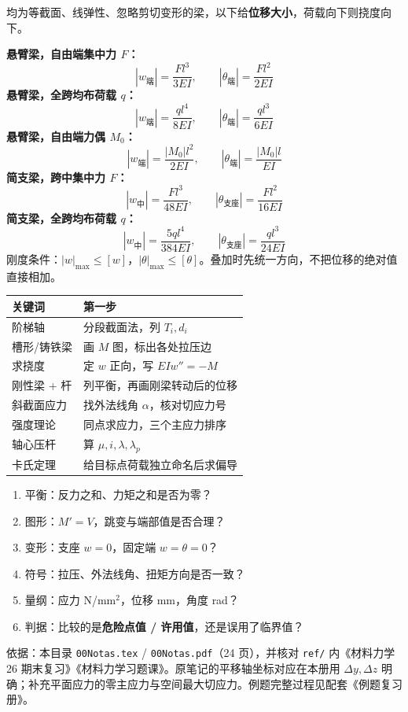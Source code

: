 \documentclass[a4paper,10pt,fontset=none]{ctexart}
\begin{document}
\begin{rightcol}
均为等截面、线弹性、忽略剪切变形的梁，以下给\textbf{位移大小}，荷载向下则挠度向下。

\textbf{悬臂梁，自由端集中力 $F$：}
\[
|w_{\text{端}}|=\frac{Fl^3}{3EI},\qquad
|\theta_{\text{端}}|=\frac{Fl^2}{2EI}
\]
\textbf{悬臂梁，全跨均布荷载 $q$：}
\[
|w_{\text{端}}|=\frac{ql^4}{8EI},\qquad
|\theta_{\text{端}}|=\frac{ql^3}{6EI}
\]
\textbf{悬臂梁，自由端力偶 $M_0$：}
\[
|w_{\text{端}}|=\frac{|M_0|l^2}{2EI},\qquad
|\theta_{\text{端}}|=\frac{|M_0|l}{EI}
\]
\textbf{简支梁，跨中集中力 $F$：}
\[
|w_{\text{中}}|=\frac{Fl^3}{48EI},\qquad
|\theta_{\text{支座}}|=\frac{Fl^2}{16EI}
\]
\textbf{简支梁，全跨均布荷载 $q$：}
\[
|w_{\text{中}}|=\frac{5ql^4}{384EI},\qquad
|\theta_{\text{支座}}|=\frac{ql^3}{24EI}
\]
刚度条件：$|w|_{\max}\le[w]$，$|\theta|_{\max}\le[\theta]$。叠加时先统一方向，不把位移的绝对值直接相加。
\par\begin{tabularx}{\linewidth}{@{}lX@{}}
\toprule
关键词 & 第一步\\\midrule
阶梯轴 & 分段截面法，列 $T_i,d_i$\\
槽形/铸铁梁 & 画 $M$ 图，标出各处拉压边\\
求挠度 & 定 $w$ 正向，写 $EIw''=-M$\\
刚性梁 + 杆 & 列平衡，再画刚梁转动后的位移\\
斜截面应力 & 找外法线角 $\alpha$，核对切应力号\\
强度理论 & 同点求应力，三个主应力排序\\
轴心压杆 & 算 $\mu,i,\lambda,\lambda_p$\\
卡氏定理 & 给目标点荷载独立命名后求偏导\\\bottomrule
\end{tabularx}\par
{}
\begin{enumerate}
\item 平衡：反力之和、力矩之和是否为零？
\item 图形：$M'=V$，跳变与端部值是否合理？
\item 变形：支座 $w=0$，固定端 $w=\theta=0$？
\item 符号：拉压、外法线角、扭矩方向是否一致？
\item 量纲：应力 N/mm$^2$，位移 mm，角度 rad？
\item 判据：比较的是\textbf{危险点值 / 许用值}，还是误用了临界值？
\end{enumerate}
\vspace{2mm}
{\footnotesize\color{muted}依据：本目录 \texttt{00Notas.tex} / \texttt{00Notas.pdf}（24 页），并核对 \texttt{ref/} 内《材料力学26 期末复习》《材料力学习题课》。原笔记的平移轴坐标对应在本册用 $\Delta y,\Delta z$ 明确；补充平面应力的零主应力与空间最大切应力。例题完整过程见配套《例题复习册》。}
\end{rightcol}
\end{document}
